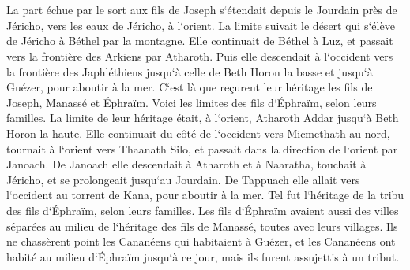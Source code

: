 \chapter{}

\verse La part échue par le sort aux fils de Joseph s`étendait depuis le Jourdain près de Jéricho, vers les eaux de Jéricho, à l`orient. La limite suivait le désert qui s`élève de Jéricho à Béthel par la montagne. 
\verse Elle continuait de Béthel à Luz, et passait vers la frontière des Arkiens par Atharoth. 
\verse Puis elle descendait à l`occident vers la frontière des Japhléthiens jusqu`à celle de Beth Horon la basse et jusqu`à Guézer, pour aboutir à la mer. 
\verse C`est là que reçurent leur héritage les fils de Joseph, Manassé et Éphraïm. 
\verse Voici les limites des fils d`Éphraïm, selon leurs familles. La limite de leur héritage était, à l`orient, Atharoth Addar jusqu`à Beth Horon la haute. 
\verse Elle continuait du côté de l`occident vers Micmethath au nord, tournait à l`orient vers Thaanath Silo, et passait dans la direction de l`orient par Janoach. 
\verse De Janoach elle descendait à Atharoth et à Naaratha, touchait à Jéricho, et se prolongeait jusqu`au Jourdain. 
\verse De Tappuach elle allait vers l`occident au torrent de Kana, pour aboutir à la mer. Tel fut l`héritage de la tribu des fils d`Éphraïm, selon leurs familles. 
\verse Les fils d`Éphraïm avaient aussi des villes séparées au milieu de l`héritage des fils de Manassé, toutes avec leurs villages. 
\verse Ils ne chassèrent point les Cananéens qui habitaient à Guézer, et les Cananéens ont habité au milieu d`Éphraïm jusqu`à ce jour, mais ils furent assujettis à un tribut. 

\chapter{}


